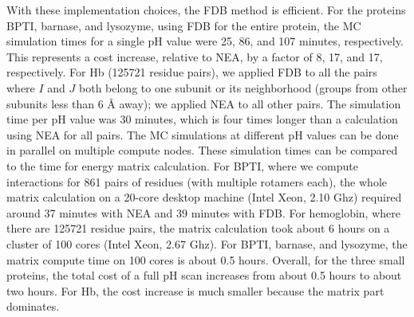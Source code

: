 \documentclass[a4paper,12pt]{article}
\begin{document}
With these implementation choices, the FDB method is efficient. For the proteins BPTI, barnase, and lysozyme, using FDB for the
entire protein, the MC simulation times for a single pH value were 25, 86, and 107 minutes, respectively. This represents a cost
increase, relative to NEA, by a factor of 8, 17, and 17, respectively. For Hb (125721 residue pairs), we applied FDB to all the
pairs where $I$ and $J$ both belong to one subunit or its neighborhood (groups from other subunits less than 6 {\AA} away); we
applied NEA to all other pairs. The simulation time per pH value was 30 minutes, which is four times longer than a calculation
using NEA for all pairs. The MC simulations at different pH values can be done in parallel on multiple compute nodes. These
simulation times can be compared to the time for energy matrix calculation. For BPTI, where we compute interactions for 861
pairs of residues (with multiple rotamers each), the whole matrix calculation on a 20-core desktop machine (Intel Xeon, 2.10 Ghz)
required around 37 minutes with NEA and 39 minutes with FDB. For hemoglobin, where there are 125721 residue pairs, the matrix
calculation took about 6 hours on a cluster of 100 cores (Intel Xeon, 2.67 Ghz). For BPTI, barnase, and lysozyme, the matrix
compute time on 100 cores is about 0.5 hours. Overall, for the three small proteins, the total cost of a full pH scan increases
from about 0.5 hours to about two hours. For Hb, the cost increase is much smaller because the matrix part dominates.
\end{document}
